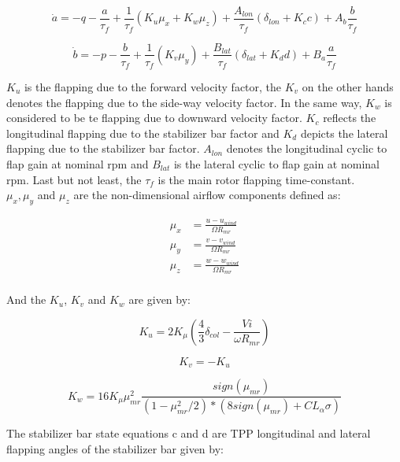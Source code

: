 \begin{equation}
	\dot{a}=-q-\frac{a}{\tau_{f}}+\frac{1}{\tau_{f}}(K_u\mu_x+K_w\mu_z)+\frac{A_{lon}}{\tau_{f}} (\delta_{lon}+K_c c)+A_b\frac{b}{\tau_{f}}
\end{equation}

\begin{equation}
	\dot{b} = -p-\frac{b}{\tau_{f}}+\frac{1}{\tau_{f}}(K_v\mu_y)+\frac{B_{lat}}{\tau_{f}}(\delta_{lat}+K_d d)+B_a \frac{a}{\tau_{f}}
\end{equation}

$K_u$ is the flapping due to the forward velocity factor, the $K_v$ on the other hands denotes the flapping due to the side-way velocity factor. In the same way, $K_w$ is considered to be te flapping due to downward velocity factor. $K_c$ reflects the longitudinal flapping due to the stabilizer bar factor and $K_d$ depicts the lateral flapping due to the stabilizer bar factor. $A_{lon}$ denotes the longitudinal cyclic to flap gain at nominal rpm and $B_{lat}$ is the lateral cyclic to flap gain at nominal rpm. Last but not least, the $\tau_f$ is the main rotor flapping time-constant.\\
$\mu_x,\mu_y$ and $\mu_z $ are the non-dimensional airflow components defined as:

\begin{equation}
	\begin{aligned}
		\mu_x&=\frac{u-u_{wind}}{\Omega R_{mr}}\\
		\mu_y&=\frac{v-v_{wind}}{\Omega R_{mr}} \\
		\mu_z&= \frac{w-w_{wind}}{\Omega R_{mr}}\\
	\end{aligned}
\end{equation}

And the $K_{u}$, $K_v$ and $K_w$ are given by:

\begin{equation}
	K_{u}=2K_{\mu}(\frac{4}{3}\delta_{col}-\frac{Vi}{\omega R_{mr}})
\end{equation}

\begin{equation}
	K_v=-K_u
\end{equation}

\begin{equation}
	K_w=16K_{\mu} \mu_{mr}^2 \frac{sign(\mu_{mr})}{(1-\mu_{mr}^2/2)*(8sign(\mu_{mr})+CL_\alpha \sigma)}
\end{equation}

The stabilizer bar state equations c and d are TPP longitudinal and lateral flapping angles of the stabilizer bar given by:

